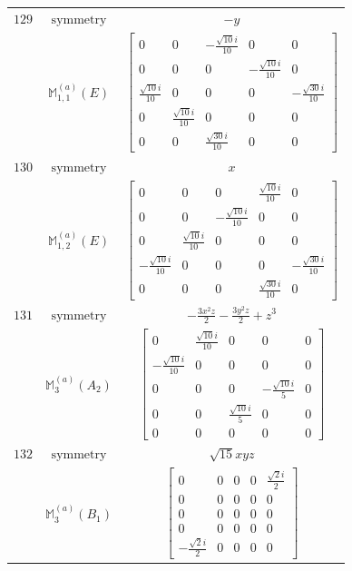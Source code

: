 \documentclass[fleqn,8pt,landscape]{jsarticle}
\begin{document}
\begin{longtable}{ccc}
$ 129 $ & $ \text{symmetry} $ & $ - y $ \\
$  $ & $ \mathbb{M}_{1,1}^{(a)}(E) $ & $ \begin{bmatrix} 0 & 0 & - \frac{\sqrt{10} i}{10} & 0 & 0 \\ 0 & 0 & 0 & - \frac{\sqrt{10} i}{10} & 0 \\ \frac{\sqrt{10} i}{10} & 0 & 0 & 0 & - \frac{\sqrt{30} i}{10} \\ 0 & \frac{\sqrt{10} i}{10} & 0 & 0 & 0 \\ 0 & 0 & \frac{\sqrt{30} i}{10} & 0 & 0 \end{bmatrix} $ \\ \hline
$ 130 $ & $ \text{symmetry} $ & $ x $ \\
$  $ & $ \mathbb{M}_{1,2}^{(a)}(E) $ & $ \begin{bmatrix} 0 & 0 & 0 & \frac{\sqrt{10} i}{10} & 0 \\ 0 & 0 & - \frac{\sqrt{10} i}{10} & 0 & 0 \\ 0 & \frac{\sqrt{10} i}{10} & 0 & 0 & 0 \\ - \frac{\sqrt{10} i}{10} & 0 & 0 & 0 & - \frac{\sqrt{30} i}{10} \\ 0 & 0 & 0 & \frac{\sqrt{30} i}{10} & 0 \end{bmatrix} $ \\ \hline
$ 131 $ & $ \text{symmetry} $ & $ - \frac{3 x^{2} z}{2} - \frac{3 y^{2} z}{2} + z^{3} $ \\
$  $ & $ \mathbb{M}_{3}^{(a)}(A_{2}) $ & $ \begin{bmatrix} 0 & \frac{\sqrt{10} i}{10} & 0 & 0 & 0 \\ - \frac{\sqrt{10} i}{10} & 0 & 0 & 0 & 0 \\ 0 & 0 & 0 & - \frac{\sqrt{10} i}{5} & 0 \\ 0 & 0 & \frac{\sqrt{10} i}{5} & 0 & 0 \\ 0 & 0 & 0 & 0 & 0 \end{bmatrix} $ \\ \hline
$ 132 $ & $ \text{symmetry} $ & $ \sqrt{15} x y z $ \\
$  $ & $ \mathbb{M}_{3}^{(a)}(B_{1}) $ & $ \begin{bmatrix} 0 & 0 & 0 & 0 & \frac{\sqrt{2} i}{2} \\ 0 & 0 & 0 & 0 & 0 \\ 0 & 0 & 0 & 0 & 0 \\ 0 & 0 & 0 & 0 & 0 \\ - \frac{\sqrt{2} i}{2} & 0 & 0 & 0 & 0 \end{bmatrix} $ \\ \hline

\end{longtable}
\end{document}
